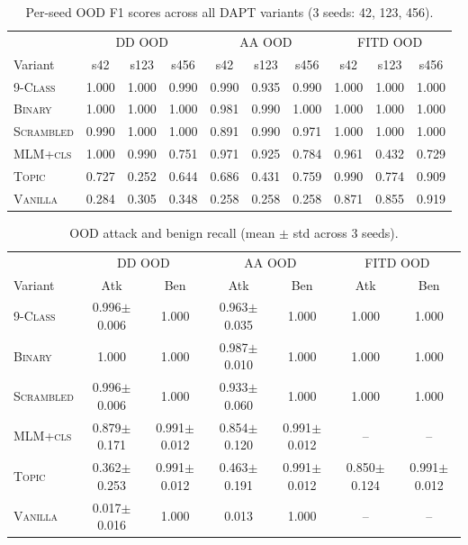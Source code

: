 \begin{table}[h]
\centering
\caption{Per-seed OOD F1 scores across all DAPT variants (3 seeds: 42, 123, 456).}
\label{tab:per-seed-f1}
\begin{tabular}{l|ccc|ccc|ccc}
\toprule
& \multicolumn{3}{c|}{DD OOD} & \multicolumn{3}{c|}{AA OOD} & \multicolumn{3}{c}{FITD OOD} \\
Variant & s42 & s123 & s456 & s42 & s123 & s456 & s42 & s123 & s456 \\
\midrule
\textsc{9-Class} & 1.000 & 1.000 & 0.990 & 0.990 & 0.935 & 0.990 & 1.000 & 1.000 & 1.000 \\
\textsc{Binary} & 1.000 & 1.000 & 1.000 & 0.981 & 0.990 & 1.000 & 1.000 & 1.000 & 1.000 \\
\textsc{Scrambled} & 0.990 & 1.000 & 1.000 & 0.891 & 0.990 & 0.971 & 1.000 & 1.000 & 1.000 \\
\textsc{MLM+cls} & 1.000 & 0.990 & 0.751 & 0.971 & 0.925 & 0.784 & 0.961 & 0.432 & 0.729 \\
\textsc{Topic} & 0.727 & 0.252 & 0.644 & 0.686 & 0.431 & 0.759 & 0.990 & 0.774 & 0.909 \\
\textsc{Vanilla} & 0.284 & 0.305 & 0.348 & 0.258 & 0.258 & 0.258 & 0.871 & 0.855 & 0.919 \\
\bottomrule
\end{tabular}
\end{table}

\begin{table}[h]
\centering
\caption{OOD attack and benign recall (mean $\pm$ std across 3 seeds).}
\label{tab:per-seed-recall}
\begin{tabular}{l|cc|cc|cc}
\toprule
& \multicolumn{2}{c|}{DD OOD} & \multicolumn{2}{c|}{AA OOD} & \multicolumn{2}{c}{FITD OOD} \\
Variant & Atk & Ben & Atk & Ben & Atk & Ben \\
\midrule
\textsc{9-Class} & 0.996$\pm$0.006 & 1.000 & 0.963$\pm$0.035 & 1.000 & 1.000 & 1.000 \\
\textsc{Binary} & 1.000 & 1.000 & 0.987$\pm$0.010 & 1.000 & 1.000 & 1.000 \\
\textsc{Scrambled} & 0.996$\pm$0.006 & 1.000 & 0.933$\pm$0.060 & 1.000 & 1.000 & 1.000 \\
\textsc{MLM+cls} & 0.879$\pm$0.171 & 0.991$\pm$0.012 & 0.854$\pm$0.120 & 0.991$\pm$0.012 & -- & -- \\
\textsc{Topic} & 0.362$\pm$0.253 & 0.991$\pm$0.012 & 0.463$\pm$0.191 & 0.991$\pm$0.012 & 0.850$\pm$0.124 & 0.991$\pm$0.012 \\
\textsc{Vanilla} & 0.017$\pm$0.016 & 1.000 & 0.013 & 1.000 & -- & -- \\
\bottomrule
\end{tabular}
\end{table}